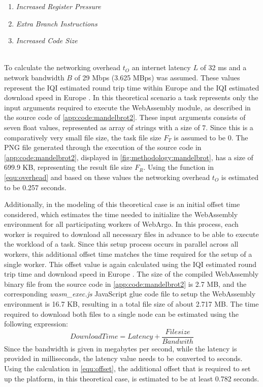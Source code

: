 \begin{enumerate}
  \item \emph{Increased Register Pressure}
  \item \emph{Extra Branch Instructions}
  \item \emph{Increased Code Size}
\end{enumerate}
~\\
To calculate the networking overhead $t_{O}$ an internet latency $L$ of 32 ms \cite{backend:latency} and a network bandwidth $B$ of 29 Mbps (3.625 MBps) \cite{backend:latency} was assumed. These values represent the \ac{IQI} estimated round trip time within Europe \cite{backend:latency} and the \ac{IQI} estimated download speed in Europe \cite{backend:latency}. In this theoretical scenario a task represents only the input arguments required to execute the WebAssembly module, as described in the source code of \autoref{app:code:mandelbrot2}. These input arguments consists of seven float values, represented as array of strings with a size of $7$. Since this is a comparatively very small file size, the task file size $F_{T}$ is assumed to be $0$. The \acs{PNG} file generated through the execution of the source code in \autoref{app:code:mandelbrot2}, displayed in \autoref{fig:methodology:mandelbrot}, has a size of 699.9 KB, representing the result file size $F_{R}$. Using the function in \eqref{equ:overhead} and based on these values the networking overhead $t_{O}$ is estimated to be 0.257 seconds.

Additionally, in the modeling of this theoretical case is an initial offset time considered, which estimates the time needed to initialize the WebAssembly environment for all participating workers of WebArgo. In this process, each worker is required to download all necessary files in advance to be able to execute the workload of a task. Since this setup process occurs in parallel across all workers, this additional offset time matches the time required for the setup of a single worker. This offset value is again calculated using the \ac{IQI} estimated round trip time and download speed in Europe \cite{backend:latency}. The size of the compiled WebAssembly binary file from the source code in \autoref{app:code:mandelbrot2} is 2.7 MB, and the corresponding \emph{wasm\_exec.js} JavaScript glue code file to setup the WebAssembly environment is 16.7 KB, resulting in a total file size of about 2.717 MB. The time required to download both files to a single node can be estimated using the following expression:
\begin{equation}
  DownloadTime = Latency + \frac{Filesize}{Bandwith} 
  \label{equ:offset}
\end{equation}
Since the bandwidth is given in megabytes per second, while the latency is provided in milliseconds, the latency value needs to be converted to seconds. Using the calculation in \eqref{equ:offset}, the additional offset that is required to set up the platform, in this theoretical case, is estimated to be at least 0.782 seconds.

